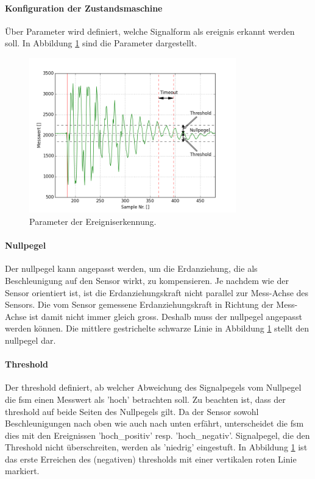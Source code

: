 \paragraph{Konfiguration der Zustandsmaschine}
 Über Parameter wird definiert, welche Signalform als \gls{ereignis} erkannt werden soll. In Abbildung \ref{fig.impact_detection_params} sind die Parameter dargestellt. 
\begin{figure}
	\centering
	\includegraphics[width=0.8\textwidth]{images/impact_params.png}
	\caption{Parameter der Ereigniserkennung.}
	\label{fig.impact_detection_params}
\end{figure}

\paragraph{Nullpegel} Der \gls{nullpegel} kann angepasst werden, um die Erdanziehung, die als Beschleunigung auf den Sensor wirkt, zu kompensieren. Je nachdem wie der Sensor orientiert ist, ist die Erdanziehungskraft nicht parallel zur Mess-Achse des Sensors. Die vom Sensor gemessene Erdanziehungskraft in Richtung der Mess-Achse ist damit nicht immer gleich gross. Deshalb muss der \gls{nullpegel} angepasst werden können. Die mittlere gestrichelte schwarze Linie in Abbildung \ref{fig.impact_detection_params} stellt den \gls{nullpegel} dar.

\paragraph{Threshold} Der \gls{threshold} definiert, ab welcher Abweichung des Signalpegels vom Nullpegel die \gls{fsm} einen Messwert als 'hoch' betrachten soll. Zu beachten ist, dass der \gls{threshold} auf beide Seiten des Nullpegels gilt. Da der Sensor sowohl Beschleunigungen nach oben wie auch nach unten erfährt, unterscheidet die \gls{fsm} dies mit den Ereignissen 'hoch\_positiv' resp. 'hoch\_negativ'. Signalpegel, die den Threshold nicht überschreiten, werden als 'niedrig' eingestuft. In Abbildung \ref{fig.impact_detection_params} ist das erste Erreichen des (negativen) \gls{threshold}s mit einer vertikalen roten Linie markiert.

